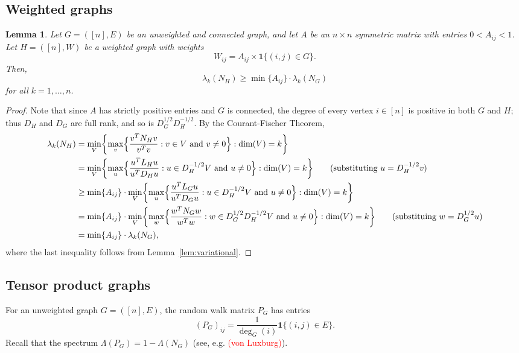 \documentclass{article}
\newcommand{\1}{\mathbf{1}}
\theoremstyle{alden}
\theoremstyle{aldenthm}
\newtheorem{lemma}{Lemma}
\theoremstyle{definition}
\theoremstyle{remark}
\begin{document}
\subsection{Weighted graphs}

\begin{lemma}
	\label{lem:weighted_graph_comparison}
	Let $G = ([n],E)$ be an unweighted and connected graph, and let $A$ be an $n \times n$ symmetric matrix with entries $0 < A_{ij} < 1$. Let $H = ([n],W)$ be a weighted graph with weights
	\begin{equation*}
	W_{ij} = A_{ij} \times \1\{(i,j) \in G\}.
	\end{equation*}
	Then, 
	\begin{equation*}
	\lambda_k(N_H) \geq \min \{A_{ij}\}  \cdot \lambda_k(N_G)
	\end{equation*}
	for all $k = 1,\ldots,n$.
\end{lemma}
\begin{proof}
	Note that since $A$ has strictly positive entries and $G$ is connected, the degree of every vertex $i \in [n]$ is positive in both $G$ and $H$; thus $D_H$ and $D_G$ are full rank, and so is $D_G^{1/2}D_H^{-1/2}$. By the Courant-Fischer Theorem,
	\begin{align*}
	\lambda_k(N_H) & = \min_V \biggl\{ \max_{v} \Bigl\{\frac{v^T N_H v}{v^T v}: v \in V~\textrm{and}~ v \neq 0\Bigr\} : \dim(V) = k\biggr\} \\
	& = \min_V \biggl\{ \max_{u} \Bigl\{\frac{u^T L_H u}{u^T D_H u}: u \in D_H^{-1/2} V~\textrm{and}~ u \neq 0\Bigr\} : \dim(V) = k\biggr\} \tag{substituting $u = D_H^{-1/2}v$}\\ 
	& \geq \min \{A_{ij} \} \cdot \min_{V} \biggl\{ \max_{u} \Bigl\{\frac{u^T L_G u}{u^T D_G u}: u \in D_H^{-1/2} V~\textrm{and}~ u \neq 0\Bigr\} : \dim(V) = k\biggr\} \\
	& = \min \{A_{ij} \} \cdot \min_{V} \biggl\{ \max_{w} \Bigl\{\frac{w^T N_G w}{w^Tw}: w \in D_G^{1/2} D_H^{-1/2} V~\textrm{and}~ u \neq 0\Bigr\} : \dim(V) = k\biggr\} \tag{substituing $w = D_G^{1/2} u$} \\
	& = \min \{A_{ij} \} \cdot \lambda_k(N_G),
	\end{align*}
	where the last inequality follows from Lemma~\ref{lem:variational}.
\end{proof}

\subsection{Tensor product graphs}
For an unweighted graph $G = ([n],E)$, the random walk matrix $P_G$ has entries
\begin{equation*}
(P_G)_{ij} = \frac{1}{\deg_G(i)} \1\{(i,j) \in E\}.
\end{equation*}
Recall that the spectrum $\Lambda(P_G) = 1 - \Lambda(N_G)$ (see, e.g. \textcolor{red}{(von Luxburg)}).
\end{document}
